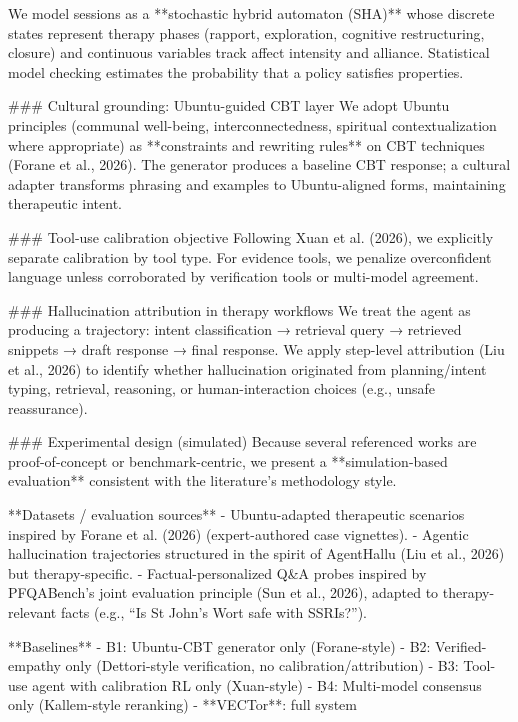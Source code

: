 We model sessions as a **stochastic hybrid automaton (SHA)** whose discrete states represent therapy phases (rapport, exploration, cognitive restructuring, closure) and continuous variables track affect intensity and alliance. Statistical model checking estimates the probability that a policy satisfies properties.

### Cultural grounding: Ubuntu-guided CBT layer  
We adopt Ubuntu principles (communal well-being, interconnectedness, spiritual contextualization where appropriate) as **constraints and rewriting rules** on CBT techniques (Forane et al., 2026). The generator produces a baseline CBT response; a cultural adapter transforms phrasing and examples to Ubuntu-aligned forms, maintaining therapeutic intent.

### Tool-use calibration objective  
Following Xuan et al. (2026), we explicitly separate calibration by tool type. For evidence tools, we penalize overconfident language unless corroborated by verification tools or multi-model agreement.

### Hallucination attribution in therapy workflows  
We treat the agent as producing a trajectory: {intent classification → retrieval query → retrieved snippets → draft response → final response}. We apply step-level attribution (Liu et al., 2026) to identify whether hallucination originated from planning/intent typing, retrieval, reasoning, or human-interaction choices (e.g., unsafe reassurance).

### Experimental design (simulated)  
Because several referenced works are proof-of-concept or benchmark-centric, we present a **simulation-based evaluation** consistent with the literature’s methodology style.

**Datasets / evaluation sources**  
- Ubuntu-adapted therapeutic scenarios inspired by Forane et al. (2026) (expert-authored case vignettes).  
- Agentic hallucination trajectories structured in the spirit of AgentHallu (Liu et al., 2026) but therapy-specific.  
- Factual-personalized Q&A probes inspired by PFQABench’s joint evaluation principle (Sun et al., 2026), adapted to therapy-relevant facts (e.g., “Is St John’s Wort safe with SSRIs?”).

**Baselines**  
- B1: Ubuntu-CBT generator only (Forane-style)  
- B2: Verified-empathy only (Dettori-style verification, no calibration/attribution)  
- B3: Tool-use agent with calibration RL only (Xuan-style)  
- B4: Multi-model consensus only (Kallem-style reranking)  
- **VECTor**: full system


